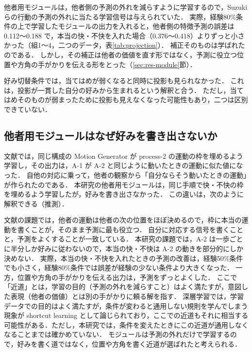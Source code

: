 他者用モジュールは，他者側の予測の外れを減らすように学習するので，Suzuki らの行動の予測の外れに当たる学習信号は与えられていた．
実際，経験80\%条件の上で学習したモジュールの出力を入れると，他者側の特徴予測の誤差は 0.112〜0.188 で，本当の快・不快を入れた場合（0.376〜0.418）よりずっと小さかった（組1〜4，二つのデータ，表\ref{tab:projection}）．
補正そのものは学ばれたのである．
しかし，その補正は他者の価値を直す形ではなく，予測に役立つ位置や方角の手がかりを伝える形をとった（\ref{sec:res-module}節）．

好み切替条件では，当てはめが弱くなると同時に投影も見られなかった．
これは，投影が一貫した自分の好みから生まれるという解釈と合う．
ただし，当てはめそのものが弱まったために投影も見えなくなった可能性もあり，二つは区別できていない．

\subsection{他者用モジュールはなぜ好みを書き出さないか}\label{sec:disc-module}
文献\cite{noguchi2022superposition}では，同じ構成の Motion Generator が process-2 の運動の枠を埋めるよう学習し，その出力は，A-1 が A-2 と同じように動いたときの運動に似た値になった．
自他の対応に乗って，他者の観察から「自分ならそう動いたときの運動」が作られたのである．
本研究の他者用モジュールは，同じ手順で快・不快の枠を埋めるよう学習したが，好みを書き出さなかった．
この違いは，次のように解釈できる（推測）．

文献\cite{noguchi2022superposition}の課題では，他者の運動は他者の次の位置をほぼ決めるので，枠に本当の運動を書くことが，そのまま予測に最も役立つ．
自分に対応する信号を書くことと，予測をよくすることが一致している．
本研究の課題では，A-2 は一歩ごとに半分しか好みに従わないので，本当の快・不快は A-2 の動きを部分的にしか決めない．
実際，本当の快・不快を入れたときの予測の改善は，経験50\%条件でも小さく，経験80\%条件では誤差が経験の少ない条件より大きくなった．
一方，位置や方角の手がかりを伝える出力は，予測をずっとよくした．
ここで「近道」とは，学習の目的（予測の外れを減らすこと）はよく満たすが，意図した表現（他者の価値）とは別の手がかりに頼る解を指す．
深層学習では，学習データでの目的はよく満たすが，条件が変わると通用しない規則を学んでしまう現象が shortcut learning として論じられており\cite{geirhos2020shortcut}，ここでの近道もそれに相当する可能性がある．ただし，本研究では，条件を変えたときにこの近道が通用しなくなることまでは確かめていない．
モジュールは予測の外れだけで学習するので，好みを書く道ではなく，位置や方角を書く近道が選ばれたと考えられる．

